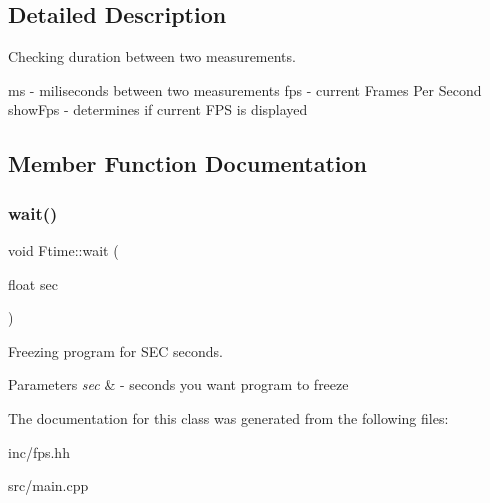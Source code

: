 \subsection{Detailed Description}
Checking duration between two measurements. 

ms -\/ miliseconds between two measurements fps -\/ current Frames Per Second show\+Fps -\/ determines if current F\+PS is displayed 

\subsection{Member Function Documentation}
\mbox{\label{class_ftime_a64b93ed0af61a91a18f053098079afad}} 
\subsubsection{\texorpdfstring{wait()}{wait()}}
{\footnotesize\ttfamily void Ftime\+::wait (\begin{DoxyParamCaption}\item[{float}]{sec }\end{DoxyParamCaption})\hspace{0.3cm}{\ttfamily [inline]}}



Freezing program for S\+EC seconds. 


\begin{DoxyParams}{Parameters}
{\em sec} & -\/ seconds you want program to freeze \\
\hline
\end{DoxyParams}


The documentation for this class was generated from the following files\+:\begin{DoxyCompactItemize}
\item 
inc/fps.\+hh\item 
src/main.\+cpp\end{DoxyCompactItemize}
